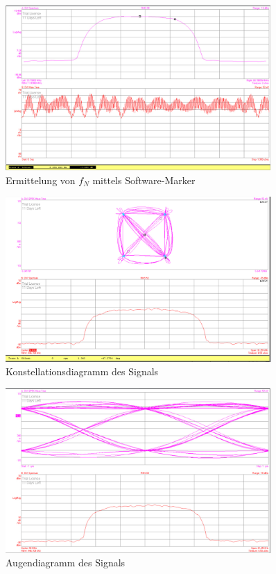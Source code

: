 \documentclass[12pt,a4paper,ngerman]{article}
\begin{document}
\begin{figure}[H]
\centering
\includegraphics[width=0.9\textwidth]{figures/Aufgabe1_QPSK_fs.jpg} 
\caption{Ermittelung von $f_N$ mittels Software-Marker}
\label{fig:1_fn}
\end{figure}

\pagebreak

\begin{figure}[H]
\centering
\includegraphics[width=0.9\textwidth]{figures/Aufgabe1_QPSK_demod.jpg} 
\caption{Konstellationsdiagramm des Signals}
\label{fig:1_konst}
\end{figure}


\begin{figure}[H]
\centering
\includegraphics[width=0.9\textwidth]{figures/Aufgabe1_QPSK_demod_i_eye.jpg} 
\caption{Augendiagramm des Signals}
\label{fig:1_auge}
\end{figure}
\end{document}
